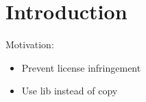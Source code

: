 
\chapter{Introduction}\label{chapter:introduction}
Motivation:
\begin{itemize}
\item Prevent license infringement
\item Use lib instead of copy
\end{itemize}